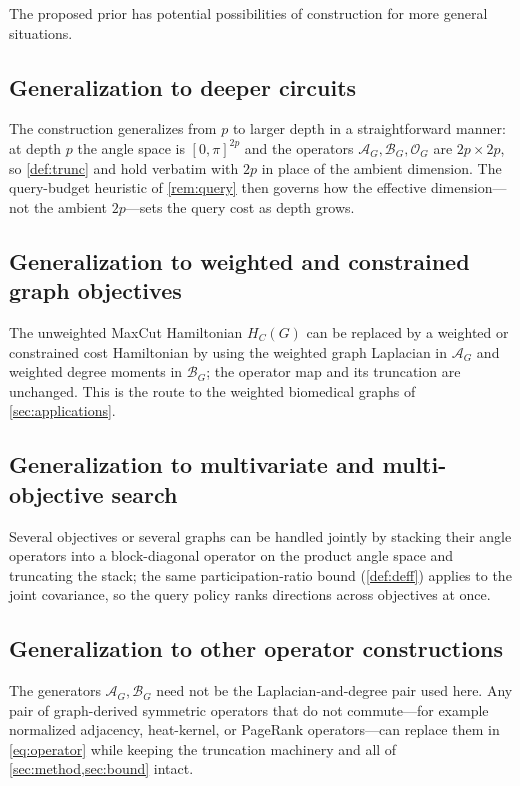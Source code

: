 \documentclass[aps,prresearch,reprint,amsmath,amssymb,floatfix,nofootinbib,superscriptaddress,longbibliography]{revtex4-2}
\theoremstyle{remark}
\newcommand{\calO}{\mathcal{O}}
\newcommand{\calA}{\mathcal{A}}
\newcommand{\calB}{\mathcal{B}}
\begin{document}
The proposed prior has potential possibilities of construction for more general
situations.

\subsection{Generalization to deeper circuits}
\label{sec:deeper}
The construction generalizes from \(p\) to larger depth in a straightforward
manner: at depth \(p\) the angle space is \([0,\pi]^{2p}\) and the operators
\(\calA_G,\calB_G,\calO_G\) are \(2p\times2p\), so \cref{def:trunc} and
 hold verbatim with \(2p\) in place of the ambient
dimension.  The query-budget heuristic of \cref{rem:query} then governs how the
effective dimension---not the ambient \(2p\)---sets the query cost as depth grows.

\subsection{Generalization to weighted and constrained graph objectives}
\label{sec:weighted}
The unweighted MaxCut Hamiltonian \(H_C(G)\) can be replaced by a weighted or
constrained cost Hamiltonian by using the weighted graph Laplacian in \(\calA_G\)
and weighted degree moments in \(\calB_G\); the operator map and its truncation
are unchanged.  This is the route to the weighted biomedical graphs of
\cref{sec:applications}.

\subsection{Generalization to multivariate and multi-objective search}
\label{sec:multivariate}
Several objectives or several graphs can be handled jointly by stacking their
angle operators into a block-diagonal operator on the product angle space and
truncating the stack; the same participation-ratio bound (\cref{def:deff}) applies
to the joint covariance, so the query policy ranks directions across objectives at
once.

\subsection{Generalization to other operator constructions}
\label{sec:otherops}
The generators \(\calA_G,\calB_G\) need not be the Laplacian-and-degree pair used
here.  Any pair of graph-derived symmetric operators that do not commute---for
example normalized adjacency, heat-kernel, or PageRank operators---can replace
them in \cref{eq:operator} while keeping the truncation machinery and all of
\cref{sec:method,sec:bound} intact.
\end{document}
